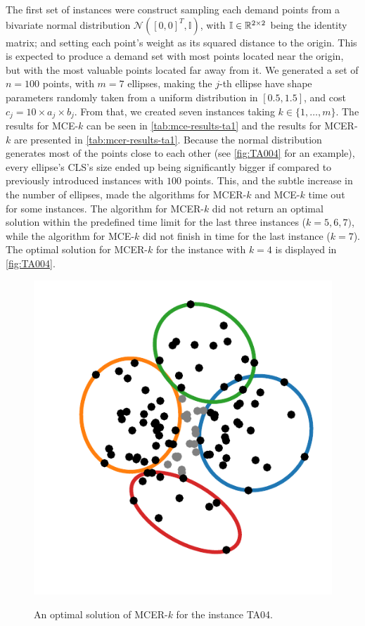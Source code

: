 The first set of instances were construct sampling each demand points from a bivariate normal distribution $\mathcal{N}([0, 0]^T, \mathbb{I})$, with $\mathbb{I} \in \mathbb{R}^{2\times 2}$ being the identity matrix; and setting each point's weight as its squared distance to the origin. This is expected to produce a demand set with most points located near the origin, but with the most valuable points located far away from it.
We generated a set of $n=100$ points, with $m=7$ ellipses, making the $j$-th ellipse have shape parameters randomly taken from a uniform distribution in $[0.5, 1.5]$, and cost $c_j=10\times a_j \times b_j$. From that, we created seven instances taking $k \in \{1, \dots, m\}$. The results for MCE-$k$ can be seen in \autoref{tab:mce-results-ta1} and the results for MCER-$k$ are presented in \autoref{tab:mcer-results-ta1}. 
Because the normal distribution generates most of the points close to each other (see \autoref{fig:TA004} for an example), every ellipse's CLS's size ended up being significantly bigger if compared to previously introduced instances with $100$ points.
This, and the subtle increase in the number of ellipses, made the algorithms for MCER-$k$ and MCE-$k$ time out for some instances. The algorithm for MCER-$k$ did not return an optimal solution within the predefined time limit for the last three instances ($k=5, 6, 7)$, while the algorithm for MCE-$k$ did not finish in time for the last instance ($k=7$). The optimal solution for MCER-$k$ for the instance with $k=4$ is displayed in \autoref{fig:TA004}. 

\begin{figure}[H]
	\centering
	\caption{An optimal solution of MCER-$k$ for the instance TA04.}
	\includegraphics[scale=.8]{tex/figures/TA004}
	\fautor
	\label{fig:TA004}
\end{figure}

